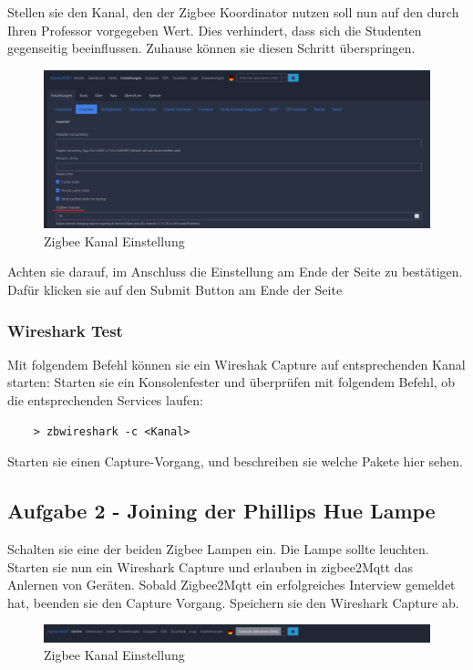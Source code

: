 Stellen sie den Kanal, den der Zigbee Koordinator nutzen soll nun auf den durch Ihren Professor vorgegeben Wert.
Dies verhindert, dass sich die Studenten gegenseitig beeinflussen. Zuhause können sie diesen Schritt überspringen.

\begin{figure}[H]
    \centering
    \includegraphics[width=1\textwidth]{media/Z2M-Channel.png}
    \caption{Zigbee Kanal Einstellung}
\end{figure}
Achten sie darauf, im Anschluss die Einstellung am Ende der Seite zu bestätigen. Dafür klicken sie auf den 
\grqq Submit \grqq{} Button am Ende der Seite

\subsubsection{Wireshark Test}
Mit folgendem Befehl können sie ein Wireshak Capture auf entsprechenden Kanal starten:
Starten sie ein Konsolenfester und überprüfen mit folgendem Befehl, ob die entsprechenden Services laufen:
\begin{lstlisting}
    > zbwireshark -c <Kanal>
\end{lstlisting}

Starten sie einen Capture-Vorgang, und beschreiben sie welche Pakete hier sehen.


\subsection{Aufgabe 2 - Joining der Phillips Hue Lampe}

Schalten sie eine der beiden Zigbee Lampen ein. Die Lampe sollte leuchten. Starten sie nun ein Wireshark Capture und
erlauben in zigbee2Mqtt das Anlernen von Geräten. Sobald Zigbee2Mqtt ein erfolgreiches Interview gemeldet hat, beenden sie
den Capture Vorgang. Speichern sie den Wireshark Capture ab.

\begin{figure}[H]
    \centering
    \includegraphics[width=1\textwidth]{media/Z2M-Anlernen.png}
    \caption{Zigbee Kanal Einstellung}
\end{figure}






